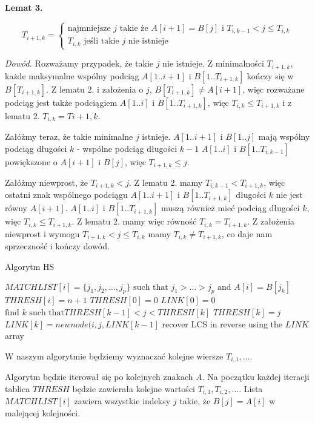 \documentclass[11pt]{article}
\begin{document}
\textbf{Lemat 3.}

$$T_{i+1,k} = \begin{cases}
    \text{najmniejsze $j$ takie że $A[i+1] = B[j]$ i $T_{i, k-1} < j \le T_{i,k}$} \\
    T_{i, k} \text{ jeśli takie $j$ nie istnieje}
\end{cases}$$

\textit{Dowód.} Rozważamy przypadek, że takie $j$ nie istnieje. Z minimalności $T_{i+1,k}$, każde maksymalne wspólny podciąg $A[1..i+1]$ i $B[1..T_{i+1,k}]$ kończy się w $B[T_{i+1,k}]$. Z lematu 2. i założenia o $j$, $B[T_{i+1,k}] \neq A[i+1]$, więc rozważane podciąg jest także podciągiem $A[1..i]$ i $B[1..T_{i+1,k}]$, więc $T_{i,k} \le T_{i+1,k}$ i z lematu 2. $T_{i,k} = T{i+1,k}$.

Załóżmy teraz, że takie minimalne $j$ istnieje. $A[1..i+1]$ i $B[1..j]$ mają wspólny podciąg długości $k$ - wspólne podciąg długości $k-1$ $A[1..i]$ i $B[1..T_{i,k-1}]$ powiększone o $A[i+1]$ i $B[j]$, więc $T_{i+1,k} \le j$. 

Załóżmy niewprost, że $T_{i+1,k} < j$. Z lematu 2. mamy $T_{i,k-1} < T_{i+1,k}$, więc ostatni znak wspólnego podciągu $A[1..i+1]$ i $B[1..T_{i+1,k}]$ długości $k$ nie jest równy $A[i+1]$. $A[1..i]$ i $B[1..T_{i+1,k}]$ muszą również mieć podciąg długości $k$, więc $T_{i,k} \le T_{i+1,k}$. Z lematu 2. mamy więc równość $T_{i, k} = T_{i+1,k}$. Z założenia niewprost i wymogu $T_{i+1,k} < j \le T_{i,k}$ mamy $T_{i,k} \neq T_{i+1,k}$, co daje nam sprzeczność i kończy dowód.

\begin{algorithm}
\caption{Algorytm HS}\label{alg:hs}
\begin{algorithmic}
    \State $MATCHLIST[i] = \{j_1, j_2, \dots, j_p\} \text{ such that $j_1 > \dots > j_p$ and $A[i] = B[j_k]$}$
    \State $THRESH[i] = n + 1$
\EndFor
\State $THRESH[0] = 0$
\State $LINK[0] = 0$
        \State $\text{find $k$ such that} THRESH[k-1] < j < THRESH[k]$
            \State $THRESH[k] = j$
            \State $LINK[k] = newnode(i, j, LINK[k-1]$
        \EndIf
    \EndFor
\EndFor
\State recover LCS in reverse using the $LINK$ array
\end{algorithmic}
\end{algorithm}

W naszym algorytmie będziemy wyznaczać kolejne wiersze $T_{i,1}, \dots$.

Algorytm będzie iterował się po kolejnych znakach $A$. Na początku każdej iteracji tablica $THRESH$ będzie zawierała kolejne wartości $T_{i,1}, T_{i,2}, \dots$. Lista $MATCHLIST[i]$ zawiera wszystkie indeksy $j$ takie, że $B[j] = A[i]$ w malejącej kolejności. 
\end{document}
